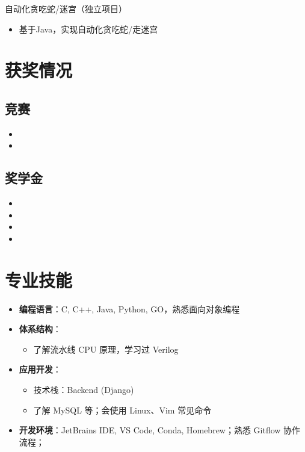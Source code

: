 \documentclass{resume}
\begin{document}

自动化贪吃蛇/迷宫（独立项目）

\begin{itemize}
  \item 基于Java，实现自动化贪吃蛇/走迷宫
\end{itemize}

\section{获奖情况}
\subsection{\textbf{竞赛}}
\begin{itemize}
  \item {}
  \item {}
\end{itemize}

\subsection{\textbf{奖学金}}
\begin{itemize}
  \item {}
  \item {}
  \item {}
  \item {}
\end{itemize}

\section{专业技能}
\begin{itemize}
  \item \textbf{编程语言}：C, C++, Java, Python, GO，熟悉面向对象编程

  \item \textbf{体系结构}：
    \begin{itemize}
      \item 了解流水线 CPU 原理，学习过 Verilog 
    \end{itemize}

  \item \textbf{应用开发}：
    \begin{itemize}
      \item 技术栈：Backend (Django)
      \item 了解 MySQL 等；会使用 Linux、Vim 常见命令
    \end{itemize}

  \item \textbf{开发环境}：JetBrains IDE, VS Code, Conda, Homebrew；熟悉 Gitflow 协作流程；
\end{itemize}
\end{document}

